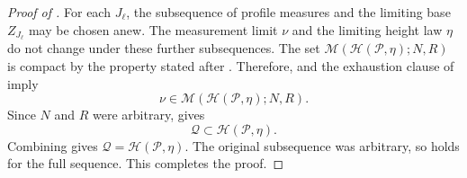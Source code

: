 \documentclass{amsart}
\numberwithin{equation}{section}
\theoremstyle{plain}
\theoremstyle{definition}
\theoremstyle{remark}
\begin{document}
\begin{proof}[Proof of ]
For each $J_\ell$, the subsequence of profile measures and the limiting base $Z_{J_\ell}$ may be chosen anew.  The
measurement limit $\nu$ and the limiting height law $\eta$ do not change under these further subsequences.  The set
$\mathcal M(\mathcal H(\mathcal P,\eta);N,R)$ is compact by the property stated after
.  Therefore,
 and the exhaustion clause of
 imply
\[
 \nu\in\mathcal M(\mathcal H(\mathcal P,\eta);N,R).
\]
Since $N$ and $R$ were arbitrary,  gives
\begin{equation}\label{eq:joint-horocone-upper-inclusion}
 \mathcal Q\subset\mathcal H(\mathcal P,\eta).
\end{equation}
Combining  gives
$\mathcal Q=\mathcal H(\mathcal P,\eta)$.  The original subsequence was arbitrary, so
 holds for the full sequence.  This completes the proof.
\end{proof}
\end{document}
